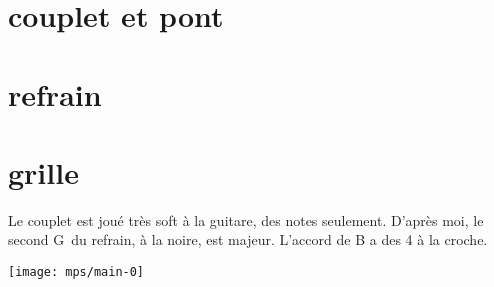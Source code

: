 \documentclass[11pt]{article}
\begin{document}
    \begin{center}
    \end{center}

%    
%
%
    \section{couplet et pont}
    

    \section{refrain}
    

%
%
%    


    \section{grille}

    Le couplet est joué tr\`es soft à la guitare, des notes seulement.
    D'apr\`es moi, le second G\sharp~du refrain, \`a la noire, est majeur. L'accord de B a des 4 \`a la croche.

    \texttt{[image: mps/main-0]}


    




%    


%    

    
\end{document}
